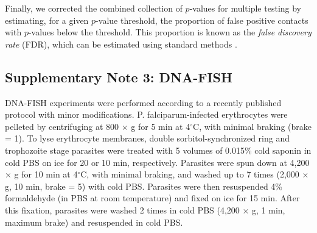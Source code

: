 Finally, we corrected the combined collection of $p$-values for multiple
testing by estimating, for a given $p$-value threshold, the proportion of
false positive contacts with $p$-values below the threshold. This proportion
is known as the {\em false discovery rate} (FDR), which can be estimated using
standard methods \citep{benjamini:controlling}.


\subsection*{Supplementary Note 3: DNA-FISH}
\label{supp:ourFISH}

DNA-FISH experiments were performed according to a recently published protocol
\citep{contreras:modified} with minor modifications. P. falciparum-infected
erythrocytes were pelleted by centrifuging at 800 $\times$ g for 5 min at
4$^\circ$C, with minimal braking (brake = 1). To lyse erythrocyte membranes,
double sorbitol-synchronized ring and trophozoite stage parasites were treated
with 5 volumes of 0.015\% cold saponin in cold PBS on ice for 20 or 10 min,
respectively. Parasites were spun down at 4,200 $\times$ g for 10 min at
4$^\circ$C, with minimal braking, and washed up to 7 times (2,000 $\times$ g,
10 min, brake = 5) with cold PBS. Parasites were then resuspended 4\%
formaldehyde (in PBS at room temperature) and fixed on ice for 15 min. After
this fixation, parasites were washed 2 times in cold PBS (4,200 $\times$ g, 1
min, maximum brake) and resuspended in cold PBS.


